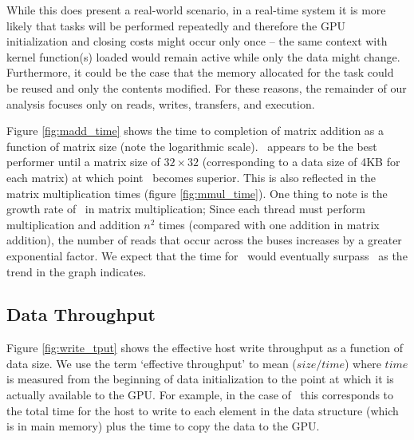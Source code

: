 
While this does present a real-world scenario, in a real-time system it is
more likely that tasks will be performed repeatedly and therefore
the GPU initialization and closing costs might occur only once -- the
same context with kernel function(s) loaded would remain active while
only the data might change. Furthermore, it could be the case that the
memory allocated for the task could be reused and only the contents
modified. For these reasons, the remainder of our analysis focuses only on reads, writes, transfers, and execution. 

Figure \ref{fig:madd_time} shows the time to completion of matrix
addition as a function of matrix size (note the logarithmic
scale). \hp\ appears to be the best performer until a matrix size of
$32\times32$ (corresponding to a data size of 4KB for each matrix) at
which point \dmh\ becomes superior. This is also reflected in the
matrix multiplication times (figure \ref{fig:mmul_time}). One thing to
note is the growth rate of \hp\ in matrix multiplication; Since each
thread must perform multiplication and addition $n^2$ times (compared
with one addition in matrix addition), the number of reads that occur
across the buses increases by a greater exponential factor. We expect that the time for \hp\ would eventually surpass \dm\ as the trend in the graph indicates.




\subsection{Data Throughput}
Figure \ref{fig:write_tput} shows the effective host write throughput
as a function of data size.  We use the term `effective throughput' to
mean ($size/time$) where $time$ is measured from the beginning of data
initialization to the point at which it is actually available to
the GPU. For example, in the case of \hd\, this corresponds to the total time for the host to write to each element in the data structure (which
is in main memory) plus the time to copy the data to the GPU.

